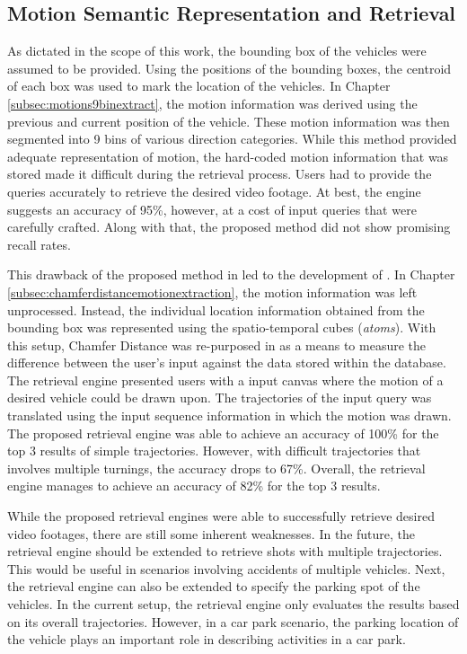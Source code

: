 \subsection*{Motion Semantic Representation and Retrieval}
As dictated in the scope of this work, the bounding box of the vehicles were assumed to be provided. Using the positions of the bounding boxes, the centroid of each box was used to mark the location of the vehicles. In Chapter \ref{subsec:motions9binextract}, the motion information was derived using the previous and current position of the vehicle. These motion information was then segmented into 9 bins of various direction categories. While this method provided adequate representation of motion, the hard-coded motion information that was stored made it difficult during the retrieval process. Users had to provide the queries accurately to retrieve the desired video footage. At best, the \versionOneRet engine suggests an accuracy of 95\%, however, at a cost of input queries that were carefully crafted. Along with that, the proposed method did not show promising recall rates. 

This drawback of the proposed method in \versionOneRet led to the development of \versionTwoRet. In Chapter \ref{subsec:chamferdistancemotionextraction}, the motion information was left unprocessed. Instead, the individual location information obtained from the bounding box was represented using the spatio-temporal cubes (\textit{atoms}). With this setup, Chamfer Distance was re-purposed in \versionTwoRet as a means to measure the difference between the user's input against the data stored within the database. The retrieval engine presented users with a input canvas where the motion of a desired vehicle could be drawn upon. The trajectories of the input query was translated using the input sequence information in which the motion was drawn. The proposed retrieval engine was able to achieve an accuracy of 100\% for the top 3 results of simple trajectories. However, with difficult trajectories that involves multiple turnings, the accuracy drops to 67\%. Overall, the retrieval engine manages to achieve an accuracy of 82\% for the top 3 results.

While the proposed retrieval engines were able to successfully retrieve desired video footages, there are still some inherent weaknesses. In the future, the retrieval engine should be extended to retrieve shots with multiple trajectories. This would be useful in scenarios involving accidents of multiple vehicles. Next, the retrieval engine can also be extended to specify the parking spot of the vehicles. In the current setup, the retrieval engine only evaluates the results based on its overall trajectories. However, in a car park scenario, the parking location of the vehicle plays an important role in describing activities in a car park.

